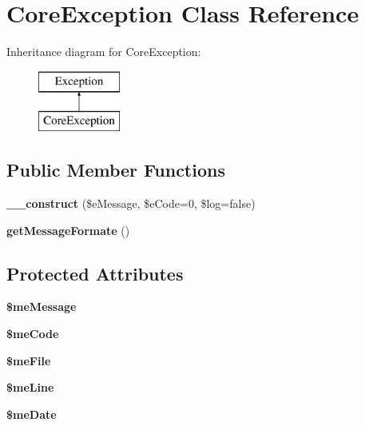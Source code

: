\section{Core\-Exception Class Reference}
\label{class_core_exception}
Inheritance diagram for Core\-Exception\-:\begin{figure}[H]
\begin{center}
\leavevmode
\includegraphics[height=2.000000cm]{class_core_exception}
\end{center}
\end{figure}
\subsection*{Public Member Functions}
\begin{DoxyCompactItemize}
\item 
{\bf \-\_\-\-\_\-construct} (\$e\-Message, \$e\-Code=0, \$log=false)
\item 
{\bf get\-Message\-Formate} ()
\end{DoxyCompactItemize}
\subsection*{Protected Attributes}
\begin{DoxyCompactItemize}
\item 
{\bfseries \$me\-Message}\label{class_core_exception_a06f7f5eb58544af93bc37a46f5790576}

\item 
{\bfseries \$me\-Code}\label{class_core_exception_a57d7256df9f104dda7403543b14d8290}

\item 
{\bfseries \$me\-File}\label{class_core_exception_a1dcbc5f489cc47c6608761e37746ac32}

\item 
{\bfseries \$me\-Line}\label{class_core_exception_a363869009d1f0ee3eb4bedb5ba3593d3}

\item 
{\bfseries \$me\-Date}\label{class_core_exception_a8202f62ce9b8485cf8bcdcc34637ef5d}

\end{DoxyCompactItemize}


